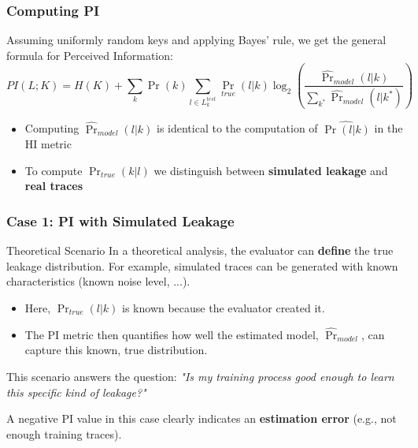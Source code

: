 \begin{frame}
    \frametitle{Computing PI}
   
        Assuming uniformly random keys and applying Bayes' rule, we get the general formula for Perceived Information:
        $$ PI(L;K) = H(K) + \sum_k \Pr(k) \sum_{l \in L_{k}^{test}} \Pr_{true}(l|k) \log_2 \left( \frac{\hat{\Pr}_{model}(l|k)}{\sum_{k^*} \hat{\Pr}_{model}(l|k^*)} \right) $$
    
    \begin{block}{}
        \begin{itemize}
            \item Computing $\hat{\Pr}_{model}(l|k)$ is identical to the computation of $\hat{\Pr(l|k)}$ in the HI metric
            
            \item To compute $\Pr_{true}(k|l)$  we distinguish between \textbf{simulated leakage} and \textbf{real traces}
        \end{itemize}
    \end{block}
\end{frame}

\begin{frame}
    \frametitle{Case 1: PI with Simulated Leakage}
    
    \begin{block}{Theoretical Scenario}
        In a theoretical analysis, the evaluator can \textbf{define} the true leakage distribution. For example, simulated traces can be generated with known characteristics (known noise level, ...).
        
        \begin{itemize}
            \item Here, $\Pr_{true}(l|k)$ is known because the evaluator created it.
            \item The PI metric then quantifies how well the estimated model, $\hat{\Pr}_{model}$, can capture this known, true distribution.
        \end{itemize}
    \end{block}
    
    \begin{alertblock}{}
        This scenario answers the question: \textit{"Is my training process good enough to learn this specific kind of leakage?"}
        
        A negative PI value in this case clearly indicates an \textbf{estimation error} (e.g., not enough training traces).
    \end{alertblock}
\end{frame}


